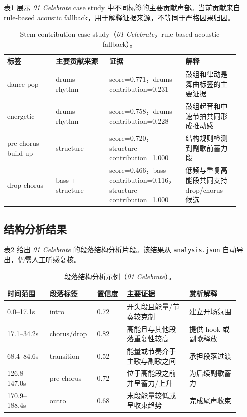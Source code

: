 \documentclass[UTF8,zihao=-4]{ctexart}
\begin{document}
表\ref{tab:contribution} 展示 \textit{01 Celebrate} case study 中不同标签的主要贡献声部。当前贡献来自 rule-based acoustic fallback，用于解释证据来源，不等同于严格因果归因。

\begin{table}[H]
\centering
\caption{Stem contribution case study（\textit{01 Celebrate}，rule-based acoustic fallback）。}
\label{tab:contribution}
\small
\begin{tabular}{p{0.20\linewidth}p{0.22\linewidth}p{0.28\linewidth}p{0.22\linewidth}}
\toprule
标签 & 主要贡献来源 & 证据 & 解释 \\
\midrule
dance-pop & drums + rhythm & score=0.771，drums contribution=0.231 & 鼓组和律动是舞曲标签的主要证据 \\
energetic & drums + rhythm & score=0.758，drums contribution=0.228 & 鼓组起音和中速节拍共同形成推动感 \\
pre-chorus build-up & structure & score=0.720，structure contribution=1.000 & 结构规则检测到副歌前蓄力段 \\
drop chorus & bass + structure & score=0.466，bass contribution=0.116，structure contribution=1.000 & 低频与重复高能段共同支持 drop/chorus 候选 \\
\bottomrule
\end{tabular}
\end{table}

\subsection{结构分析结果}

表\ref{tab:segments} 给出 \textit{01 Celebrate} 的段落结构分析片段。该结果从 \texttt{analysis.json} 自动导出，仍需人工听感复核。

\begin{table}[H]
\centering
\caption{段落结构分析示例（\textit{01 Celebrate}）。}
\label{tab:segments}
\small
\begin{tabular}{p{0.17\linewidth}p{0.18\linewidth}p{0.12\linewidth}p{0.25\linewidth}p{0.20\linewidth}}
\toprule
时间范围 & 段落标签 & 置信度 & 主要证据 & 赏析解释 \\
\midrule
0.0--17.1s & intro & 0.72 & 开头段且能量/节奏较克制 & 建立开场氛围 \\
17.1--34.2s & chorus/drop & 0.82 & 高能且与其他段落重复性较高 & 提供 hook 或副歌释放 \\
68.4--84.6s & transition & 0.52 & 能量或节奏介于主歌与副歌之间 & 承担段落过渡 \\
126.8--147.0s & pre-chorus & 0.72 & 位于高能段之前并呈蓄力/上升 & 为后续副歌蓄力 \\
170.9--188.4s & outro & 0.68 & 末段能量较低或呈收束趋势 & 完成尾声收束 \\
\bottomrule
\end{tabular}
\end{table}
\end{document}
